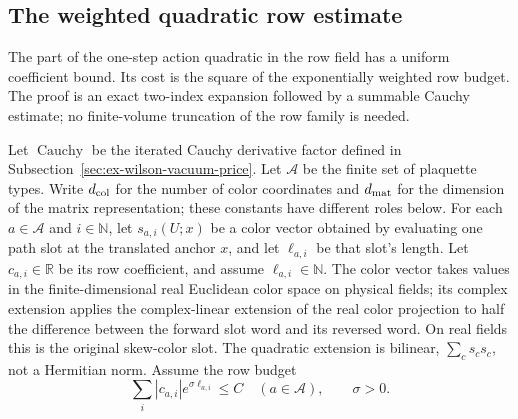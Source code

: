 \subsection{The weighted quadratic row estimate}
\label{sec:ex-row-quadratic-price}

The part of the one-step action quadratic in the row field has a uniform
coefficient bound. Its cost is the square of the exponentially weighted row
budget. The proof is an exact two-index expansion followed by a summable
Cauchy estimate; no finite-volume truncation of the row family is needed.

Let $\operatorname{Cauchy}$ be the iterated Cauchy derivative factor defined
in Subsection~\ref{sec:ex-wilson-vacuum-price}. Let $\mathcal A$ be the finite set
of plaquette types. Write $d_{\rm col}$ for
the number of color coordinates and $d_{\rm mat}$ for the dimension of the
matrix representation; these constants have different roles below. For each
$a\in\mathcal A$ and $i\in\mathbb N$, let $s_{a,i}(U;x)$ be a color vector
obtained by evaluating one path slot at the translated anchor $x$, and let
$\ell_{a,i}$ be that slot's length. Let $c_{a,i}\in\mathbb R$ be its row
coefficient, and assume $\ell_{a,i}\in\mathbb N$. The color vector takes values
in the finite-dimensional real Euclidean color space on physical fields; its
complex extension applies the complex-linear extension of the real color
projection to half the difference between the forward slot word and its
reversed word. On real fields this is the original skew-color slot. The
quadratic extension is bilinear, $\sum_c s_c s_c$, not a Hermitian norm.
Assume the row budget
\begin{equation}\label{eq:ex-row-budget}
 \sum_i |c_{a,i}|e^{\sigma\ell_{a,i}}\leq C
       \quad(a\in\mathcal A),\qquad \sigma>0.
\end{equation}

